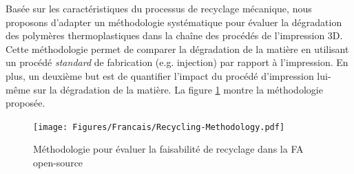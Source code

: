 Basée sur les caractéristiques du processus de recyclage mécanique, nous proposons d'adapter un méthodologie systématique pour évaluer la dégradation des polymères thermoplastiques dans la chaîne des procédés de l'impression 3D.
Cette méthodologie permet de comparer la dégradation de la matière en utilisant un procédé \textit{standard} de fabrication (e.g. injection) par rapport à l'impression.
En plus, un deuxième but est de quantifier l'impact du procédé d'impression lui-même sur la dégradation de la matière.
La figure \ref{Recycling.Methodology.Francais} montre la méthodologie proposée.

\begin{figure}
	\centering
	\texttt{[image: Figures/Francais/Recycling-Methodology.pdf]}
	\caption[]{Méthodologie pour évaluer la faisabilité de recyclage dans la FA open-source}
	\label{Recycling.Methodology.Francais}
\end{figure}	

\newpage	



